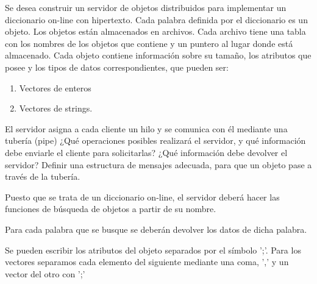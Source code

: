   \begin{problem}[15]
  Se desea construir un servidor de objetos distribuidos para
implementar un diccionario on-line con hipertexto. Cada palabra definida
 por el diccionario es un objeto. Los objetos están almacenados en
archivos. Cada archivo tiene una tabla con los nombres de los objetos
que contiene y un puntero al lugar donde está almacenado. Cada objeto
contiene información sobre su tamaño, los atributos que posee y los
tipos de datos correspondientes, que pueden ser:

\begin{enumerate}
  \item	Vectores de enteros

  \item	Vectores de strings.
\end{enumerate}
  
  El servidor asigna a cada cliente un hilo y se comunica con él mediante una tubería
  (pipe)
      \ppart ¿Qué operaciones posibles realizará el servidor, y qué información debe enviarle el cliente para solicitarlas?
    \ppart ¿Qué información debe devolver el servidor?
    \ppart Definir una estructura de mensajes adecuada, para que un objeto pase a través de la tubería.

 \solution

\yoP

\spart
Puesto que se trata de un diccionario on-line, el servidor deberá hacer las funciones de búsqueda de objetos a partir de su nombre.

\spart
Para cada palabra que se busque se deberán devolver los datos de dicha palabra.

\spart

Se pueden escribir los atributos del objeto separados por el símbolo ';'. Para los vectores separamos cada elemento del siguiente mediante una coma, ',' y un vector del otro con ';'

 \end{problem}



